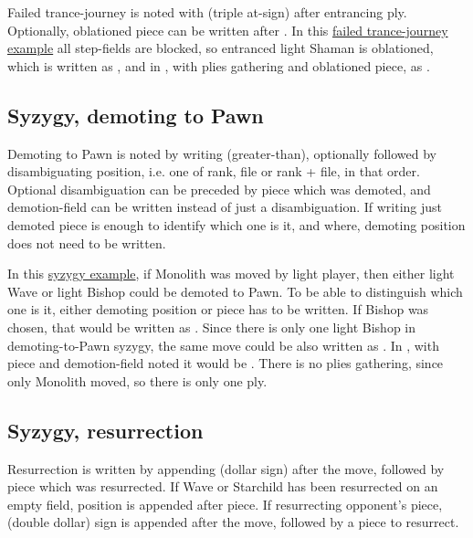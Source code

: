 Failed trance-journey is noted with  (triple at-sign) after entrancing ply.
Optionally, oblationed piece can be written after . In this
\hyperref[fig:scn_o_29_trance_journey_failed]{failed trance-journey example} all
step-fields are blocked, so entranced light Shaman is oblationed, which is written as
, and in , with plies gathering and oblationed piece, as
.

\subsection*{Syzygy, demoting to Pawn}
\label{sec:Appendix/Notation/Syzygy, demoting to Pawn}

Demoting to Pawn is noted by writing \alg{>} (greater-than), optionally followed by
disambiguating position, i.e. one of rank, file or rank + file, in that order. Optional
disambiguation can be preceded by piece which was demoted, and demotion-field can be
written instead of just a disambiguation. If writing just demoted piece is enough to
identify which one is it, and where, demoting position does not need to be written.

In this \hyperref[fig:scn_d_21_syzygy_2_stars_init]{syzygy example}, if Monolith was
moved by light player, then either light Wave or light Bishop could be demoted to Pawn.
To be able to distinguish which one is it, either demoting position or piece has to be
written. If Bishop was chosen, that would be written as . Since there is
only one light Bishop in demoting-to-Pawn syzygy, the same move could be also written
as . In , with piece and demotion-field noted it would be
. There is no plies gathering, since only Monolith moved, so there
is only one ply.

\subsection*{Syzygy, resurrection}
\label{sec:Appendix/Notation/Syzygy, resurrection}

Resurrection is written by appending \alg{\$} (dollar sign) after the move, followed by
piece which was resurrected. If Wave or Starchild has been resurrected on an empty field,
position is appended after piece. If resurrecting opponent's piece, \alg{\$\$} (double
dollar) sign is appended after the move, followed by a piece to resurrect.

